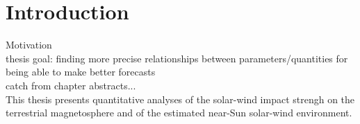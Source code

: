 
\chapter{Introduction}
\label{chap:introduction}

Motivation\\




thesis goal: finding more precise relationships between parameters/quantities for being able to make better forecasts\\

catch from chapter abstracts...\\

This thesis presents quantitative analyses of the solar-wind impact strengh on the terrestrial magnetosphere and of the estimated near-Sun solar-wind environment.\\


